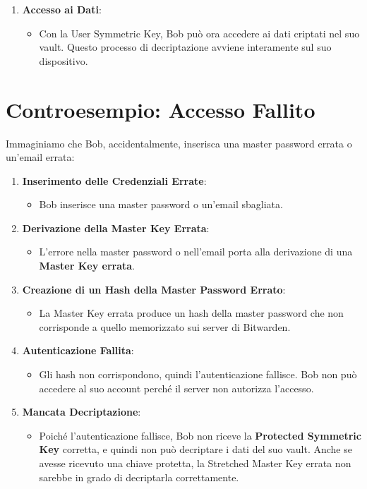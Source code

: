 \documentclass[a4paper,12pt]{report}
\begin{document}
\begin{enumerate}
					\item \textbf{Accesso ai Dati}:
					\begin{itemize}
						\item Con la User Symmetric Key, Bob può ora accedere ai dati criptati nel suo vault. Questo processo di decriptazione avviene interamente sul suo dispositivo.
					\end{itemize}
				\end{enumerate}

				\section*{Controesempio: Accesso Fallito}

				Immaginiamo che Bob, accidentalmente, inserisca una master password errata o un'email errata:

				\begin{enumerate}
					\item \textbf{Inserimento delle Credenziali Errate}:
					\begin{itemize}
						\item Bob inserisce una master password o un'email sbagliata.
					\end{itemize}

					\item \textbf{Derivazione della Master Key Errata}:
					\begin{itemize}
						\item L'errore nella master password o nell'email porta alla derivazione di una \textbf{Master Key errata}.
					\end{itemize}

					\item \textbf{Creazione di un Hash della Master Password Errato}:
					\begin{itemize}
						\item La Master Key errata produce un hash della master password che non corrisponde a quello memorizzato sui server di Bitwarden.
					\end{itemize}

					\item \textbf{Autenticazione Fallita}:
					\begin{itemize}
						\item Gli hash non corrispondono, quindi l'autenticazione fallisce. Bob non può accedere al suo account perché il server non autorizza l'accesso.
					\end{itemize}

					\item \textbf{Mancata Decriptazione}:
					\begin{itemize}
						\item Poiché l'autenticazione fallisce, Bob non riceve la \textbf{Protected Symmetric Key} corretta, e quindi non può decriptare i dati del suo vault. Anche se avesse ricevuto una chiave protetta, la Stretched Master Key errata non sarebbe in grado di decriptarla correttamente.
					\end{itemize}
				\end{enumerate}
\end{document}
